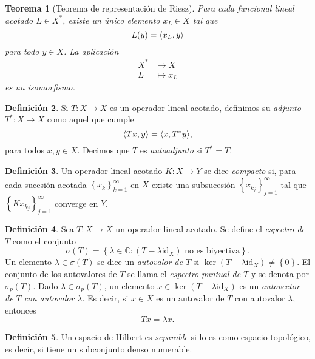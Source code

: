 \documentclass[12pt,a4paper]{article}
\newtheorem{thm}{Teorema}[section]
\theoremstyle{definition} \newtheorem{defn}[thm]{Definición}
\theoremstyle{definition} \newtheorem{ejemplo}[thm]{Ejemplo}
\theoremstyle{definition} \newtheorem{ejercicio}[thm]{Ejercicio}
\theoremstyle{remark} \newtheorem*{obs}{Observación}
\DeclarePairedDelimiter\esc{\langle}{\rangle}
\newcommand{\CC}{\mathbb{C}}
\newcommand{\id}{\mathrm{id}}
\begin{document}
 \begin{thm}[Teorema de representación de Riesz]
   Para cada funcional lineal acotado $L\in X^*$, existe un único elemento $x_L \in X$ tal que
   \begin{equation*}
     L(y) = \esc{x_L,y}
   \end{equation*}
   para todo $y\in X$. La aplicación 
   \begin{align*}
      X^*&\longrightarrow X\\ 
       L &\longmapsto x_L 
     \end{align*}
     es un isomorfismo.
 \end{thm}
 \begin{defn}
   Si $T:X\rightarrow X$ es un operador lineal acotado, definimos su \emph{adjunto} $T^*:X\rightarrow X$ como aquel que cumple
   \begin{equation*}
     \esc{Tx,y}=\esc{x,T^*y},
   \end{equation*}
   para todos $x,y \in X$. Decimos que $T$ es \emph{autoadjunto} si $T^*=T$.
 \end{defn}
 \begin{defn}
   Un operador lineal acotado $K:X\rightarrow Y$ se dice \emph{compacto} si, para cada sucesión acotada $\left\{ x_k \right\}_{k=1}^\infty$ en $X$ existe una subsucesión $\left\{ x_{k_j} \right\}_{j=1}^\infty$ tal que $\left\{ Kx_{k_j} \right\}_{j=1}^\infty$ converge en $Y$.
 \end{defn}
 \begin{defn}
   Sea $T:X\rightarrow X$ un operador lineal acotado. Se define el \emph{espectro de $T$} como el conjunto
   \begin{equation*}
     \sigma(T)=\left\{ \lambda \in \CC: (T-\lambda \id_X) \text{ no es biyectiva} \right\}. 
   \end{equation*}
   Un elemento $\lambda \in \sigma(T)$ se dice un \emph{autovalor de $T$} si $\ker(T-\lambda \id_X)\neq \left\{ 0 \right\}$. El conjunto de los autovalores de $T$ se llama el \emph{espectro puntual de $T$} y se denota por $\sigma_p(T)$. Dado $\lambda \in \sigma_p(T)$, un elemento $x\in \ker(T-\lambda \id_X)$ es un \emph{autovector de $T$ con autovalor $\lambda$}. Es decir, si $x\in X$ es un autovalor de $T$ con autovalor $\lambda$, entonces
   \begin{equation*}
     Tx = \lambda x.
   \end{equation*}
 \end{defn}
 \begin{defn}
   Un espacio de Hilbert es \emph{separable} si lo es como espacio topológico, es decir, si tiene un subconjunto denso numerable.
 \end{defn}
\end{document}
